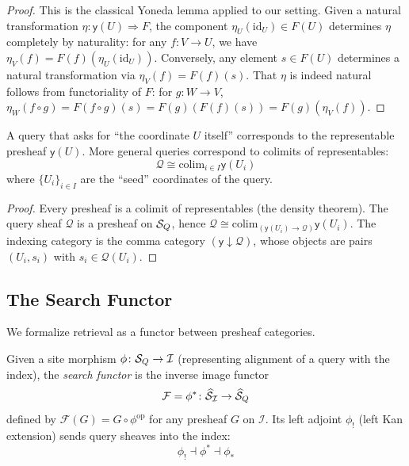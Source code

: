 \documentclass[11pt]{article}
\newcommand{\SemIndex}{\mathcal{I}}
\newcommand{\QuerySheaf}{\mathcal{Q}}
\newcommand{\Presh}{\widehat{\Site}}                 %
\newcommand{\yo}{\mathsf{y}}                         %
\newcommand{\colim}{\mathrm{colim}}                 %
\newcommand{\SearchFunctor}{\mathcal{F}}             %
\begin{document}
\begin{proof}
This is the classical Yoneda lemma applied to our setting.  Given a
natural transformation $\eta \colon \yo(U) \Rightarrow F$, the component
$\eta_U(\mathrm{id}_U) \in F(U)$ determines $\eta$ completely by
naturality: for any $f \colon V \to U$, we have
$\eta_V(f) = F(f)(\eta_U(\mathrm{id}_U))$.  Conversely, any element
$s \in F(U)$ determines a natural transformation via
$\eta_V(f) = F(f)(s)$.  That $\eta$ is indeed natural follows from
functoriality of $F$: for $g \colon W \to V$,
$\eta_W(f \circ g) = F(f \circ g)(s) = F(g)(F(f)(s)) = F(g)(\eta_V(f))$.
\end{proof}

\begin{corollary}\label{cor:rep-query}
A query that asks for ``the coordinate $U$ itself'' corresponds to
the representable presheaf $\yo(U)$.  More general queries correspond to
colimits of representables:
\[
  \QuerySheaf \cong \colim_{i \in I} \yo(U_i)
\]
where $\{U_i\}_{i \in I}$ are the ``seed'' coordinates of the query.
\end{corollary}

\begin{proof}
Every presheaf is a colimit of representables (the density theorem).
The query sheaf $\QuerySheaf$ is a presheaf on $\mathcal{S}_Q$, hence
$\QuerySheaf \cong \colim_{(\yo(U_i) \to \QuerySheaf)} \yo(U_i)$.
The indexing category is the comma category $(\yo \downarrow \QuerySheaf)$,
whose objects are pairs $(U_i, s_i)$ with $s_i \in \QuerySheaf(U_i)$.
\end{proof}

\subsection{The Search Functor}

We formalize retrieval as a functor between presheaf categories.

\begin{definition}\label{def:search-functor}
Given a site morphism $\phi \colon \Site_Q \to \SemIndex$ (representing
alignment of a query with the index), the \emph{search functor} is the
inverse image functor
\[
  \SearchFunctor = \phi^{*} \colon \Presh_{\SemIndex} \to \Presh_Q
\]
defined by $\SearchFunctor(G) = G \circ \phi^{\mathrm{op}}$ for any
presheaf $G$ on $\SemIndex$.  Its left adjoint $\phi_{!}$ (left Kan
extension) sends query sheaves into the index:
\[
  \phi_{!} \dashv \phi^{*} \dashv \phi_{*}
\]
\end{definition}
\end{document}
